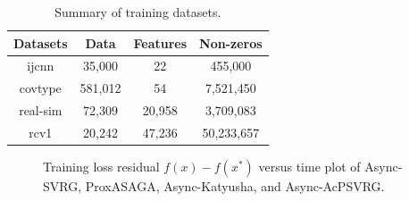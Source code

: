\begin{table}[htbp]
\begin{center}
\caption{Summary of training datasets.}
\begin{tabular}{ c|c|c|c } 
 \hline
 Datasets &  Data & Features & Non-zeros \\ 
 \hline
  ijcnn & 35,000 & 22 &  455,000\\
  covtype & 581,012 & 54 & 7,521,450\\ 
 real-sim &  72,309 & 20,958 &  3,709,083 \\
 rcv1 & 20,242 & 47,236 &  50,233,657\\
 \hline
\end{tabular}
\label{metadata}
\end{center}
\end{table}
\begin{figure}[htbp]

%
%
%
%
\setlength{\abovecaptionskip}{2pt}
\caption{Training loss residual $f(x) - f(x^*)$ versus time plot of Async-SVRG, ProxASAGA, Async-Katyusha, and Async-AcPSVRG. }
\label{fig:algo_comp}
\end{figure}
